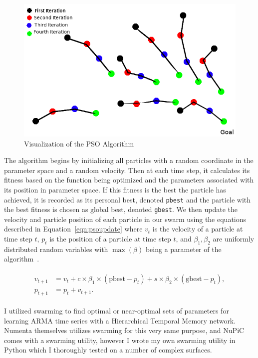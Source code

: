 \documentclass[oneside,12pt,openany]{book}
\begin{document}
	\begin{figure}[!ht]
		\centering
		\includegraphics[width=.7\linewidth]{images/PSOVisual.png}
		\caption{Visualization of the PSO Algorithm}
		\label{fig:PSOVisual}
	\end{figure}
	
	The algorithm begins by initializing all particles with a random coordinate in the parameter space and a random velocity. Then at each time step, it calculates its fitness based on the function being optimized and the parameters associated with its position in parameter space. If this fitness is the best the particle has achieved, it is recorded as its personal best, denoted \texttt{pbest} and the particle with the best fitness is chosen as global best, denoted \texttt{gbest}. We then update the velocity and particle position of each particle in our swarm using the equations described in Equation~\eqref{eqn:psoupdate} where $v_{t}$ is the velocity of a particle at time step $t$, $p_{t}$ is the position of a particle at time step $t$, and $\beta_{1}, \beta_{2}$ are uniformly distributed random variables with $\max(\beta)$ being a parameter of the algorithm~\cite{PSOReview}.
	
	\begin{align}
	\label{eqn:psoupdate}
	\begin{split}
	v_{t+1} &= v_{t}+c\times \beta_{1} \times (\text{pbest}-p_{t})+s\times \beta_{2} \times (\text{gbest}-p_{t}), \\
	p_{t+1} &= p_{t} + v_{t+1} .
	\end{split}
	\end{align}
	
	I utilized swarming to find optimal or near-optimal sets of parameters for learning ARMA time series with a Hierarchical Temporal Memory network. Numenta themselves utilizes swarming for this very same purpose, and NuPiC comes with a swarming utility, however I wrote my own swarming utility in Python which I thoroughly tested on a number of complex surfaces.
	
\end{document}
